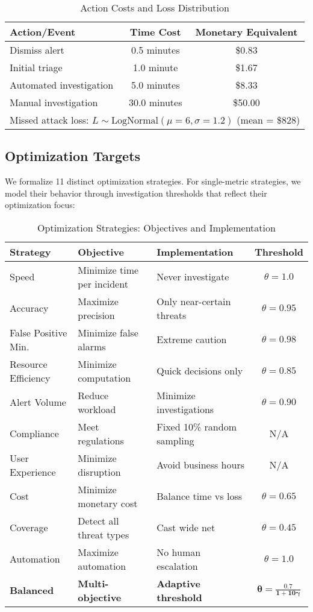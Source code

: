 \documentclass[10pt,conference]{IEEEtran}
\begin{document}
\begin{table}[!h]
\centering
\caption{Action Costs and Loss Distribution}
\begin{tabular}{@{}lcc@{}}
\toprule
\textbf{Action/Event} & \textbf{Time Cost} & \textbf{Monetary Equivalent} \\
\midrule
Dismiss alert & 0.5 minutes & \$0.83 \\
Initial triage & 1.0 minute & \$1.67 \\
Automated investigation & 5.0 minutes & \$8.33 \\
Manual investigation & 30.0 minutes & \$50.00 \\
\midrule
\multicolumn{3}{l}{Missed attack loss: $L \sim \text{LogNormal}(\mu=6, \sigma=1.2)$ (mean = \$828)} \\
\bottomrule
\end{tabular}
\end{table}

\subsection{Optimization Targets}

We formalize 11 distinct optimization strategies. For single-metric strategies, we model their behavior through investigation thresholds that reflect their optimization focus:

\begin{table*}[h]
\centering
\caption{Optimization Strategies: Objectives and Implementation}
\footnotesize
\begin{tabular}{@{}lllc@{}}
\toprule
\textbf{Strategy} & \textbf{Objective} & \textbf{Implementation} & \textbf{Threshold} \\
\midrule
Speed & Minimize time per incident & Never investigate & $\theta = 1.0$ \\
Accuracy & Maximize precision & Only near-certain threats & $\theta = 0.95$ \\
False Positive Min. & Minimize false alarms & Extreme caution & $\theta = 0.98$ \\
Resource Efficiency & Minimize computation & Quick decisions only & $\theta = 0.85$ \\
Alert Volume & Reduce workload & Minimize investigations & $\theta = 0.90$ \\
Compliance & Meet regulations & Fixed 10\% random sampling & N/A \\
User Experience & Minimize disruption & Avoid business hours & N/A \\
Cost & Minimize monetary cost & Balance time vs loss & $\theta = 0.65$ \\
Coverage & Detect all threat types & Cast wide net & $\theta = 0.45$ \\
Automation & Maximize automation & No human escalation & $\theta = 1.0$ \\
\rowcolor{ieeegreen!10}
\textbf{Balanced} & \textbf{Multi-objective} & \textbf{Adaptive threshold} & $\boldsymbol{\theta = \frac{0.7}{1 + 10\gamma}}$ \\
\bottomrule
\end{tabular}
\end{table*}
\end{document}
